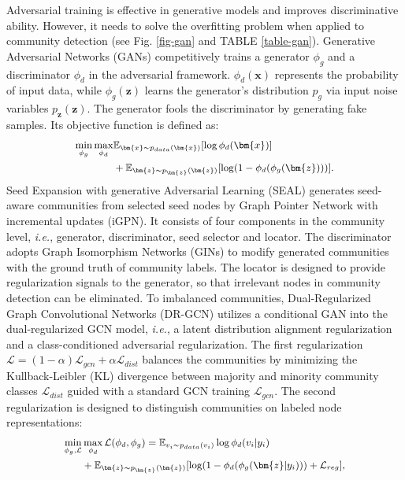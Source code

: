 \label{sec-model-gan}
Adversarial training is effective in generative models and improves discriminative ability. However, it needs to solve the overfitting problem when applied to community detection (see Fig. \ref{fig-gan} and TABLE \ref{table-gan}). Generative Adversarial Networks (GANs)  competitively trains a generator $\phi_g$ and a discriminator $\phi_d$ in the adversarial framework. $\phi_d(\bm{x})$ represents the probability of input data, while $\phi_g(\bm{z})$ learns the generator's distribution $p_g$ via input noise variables $p_{\bm{z}}(\bm{z})$. The generator fools the discriminator by generating fake samples. Its objective function is defined as: 
\begin{equation}
\small
\begin{aligned}
\min_{\phi_g} \max_{\phi_d} & \mathbb{E}_{\bm{x} \sim p_{data}(\bm{x})} [\log \phi_d(\bm{x})] \\
& +\mathbb{E}_{\bm{z} \sim p_{\bm{z} }(\bm{z} )} [\log (1-\phi_d(\phi_g(\bm{z} )))]. 
\end{aligned}
\end{equation}
Seed Expansion with generative Adversarial Learning (SEAL)  generates seed-aware communities from selected seed nodes by Graph Pointer Network with incremental updates (iGPN). It consists of four components in the community level, \textit{i.e.}, generator, discriminator, seed selector and locator. The discriminator adopts Graph Isomorphism Networks (GINs) to modify generated communities with the ground truth of community labels. The locator is designed to provide regularization signals to the generator, so that irrelevant nodes in community detection can be eliminated.
To imbalanced communities, Dual-Regularized Graph Convolutional Networks (DR-GCN)  utilizes a conditional GAN into the dual-regularized GCN model, \textit{i.e.}, a latent distribution alignment regularization and a class-conditioned adversarial regularization. The first
regularization $\mathcal{L}=(1-\alpha)\mathcal{L}_{gcn}+\alpha \mathcal{L}_{dist}$ balances the communities by minimizing the Kullback-Leibler (KL) divergence between majority and minority community classes $\mathcal{L}_{dist}$ guided with a standard GCN training $\mathcal{L}_{gcn}$. The second regularization is designed to distinguish communities on labeled node representations:
\begin{equation}
\small
\begin{aligned}
\min_{\phi_{g}, \mathcal{L}} &\max_{\phi_{d}} \mathcal{L}(\phi_{d}, \phi_{g}) = \mathbb{E}_{v_{i} \sim p_{data}(v_{i})} \log \phi_{d}(v_{i} |y_{i}) \\
& +\mathbb{E}_{\bm{z} \sim p_{\bm{z}}(\bm{z})} [\log(1-\phi_{d}(\phi_{g}(\bm{z} |y_{i}))) + \mathcal{L}_{reg}], 
\end{aligned}
\end{equation}

